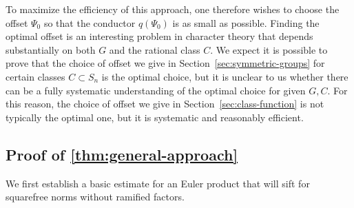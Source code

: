 \documentclass[12pt]{amsart}
\theoremstyle{definition} \newtheorem{definition}[theorem]{Definition}
\theoremstyle{example} \newtheorem{example}[theorem]{Example}
\theoremstyle{remark} \newtheorem{remark}{Remark}[theorem]
\numberwithin{equation}{section}
\numberwithin{theorem}{section}
\begin{document}
	To maximize the efficiency of this approach, one therefore wishes to choose the offset $\Psi_0$ so that the conductor $q(\Psi_0)$ is as small as possible.  Finding the optimal offset is an interesting problem in character theory that depends substantially on both $G$ and the rational class $C$.  We expect it is possible to prove that the choice of offset we give in Section~\ref{sec:symmetric-groups} for certain classes $C \subset S_n$ is the optimal choice, but it is unclear to us whether there can be a fully systematic understanding of the optimal choice for given $G,C$.  For this reason, the choice of offset we give in Section~\ref{sec:class-function} is not typically the optimal one, but it is systematic and reasonably efficient.
	



\subsection{Proof of \cref{thm:general-approach}}
We first establish a basic  estimate for an Euler product that will  sift for squarefree norms without ramified factors. 
\end{document}
